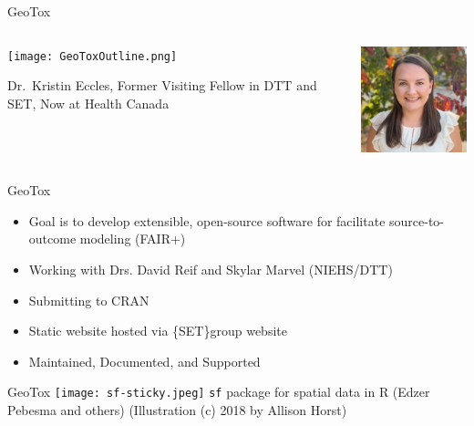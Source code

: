 \documentclass[
  ignorenonframetext,
]{beamer}
\providecommand{\tightlist}{%
  \setlength{\itemsep}{0pt}\setlength{\parskip}{0pt}}\usepackage{longtable,booktabs,array}
\begin{document}
\begin{frame}[shrink]{GeoTox}
\label{geotox}
\begin{columns}[T]
\begin{column}{0.75\textwidth}
\texttt{[image: GeoToxOutline.png]}

Dr.~Kristin Eccles, Former Visiting Fellow in DTT and SET, Now at Health
Canada
\end{column}

\begin{column}{0.25\textwidth}
\includegraphics{../../presentations/20240214_SOT_ISES_Webinar/Eccles_headshot_resized.jpg}
\end{column}
\end{columns}
\end{frame}

\begin{frame}{GeoTox}
\label{geotox-1}
\begin{itemize}
\tightlist
\item
  Goal is to develop extensible, open-source software for facilitate
  source-to-outcome modeling (FAIR+)
\item
  Working with Drs. David Reif and Skylar Marvel (NIEHS/DTT)
\item
  Submitting to CRAN
\item
  Static website hosted via \{SET\}group website
\item
  Maintained, Documented, and Supported
\end{itemize}
\end{frame}

\begin{frame}{GeoTox}
\label{geotox-2}
\texttt{[image: sf-sticky.jpeg]} \texttt{sf} package for spatial data in
R (Edzer Pebesma and others) (Illustration (c) 2018 by Allison Horst)
\end{frame}
\end{document}
